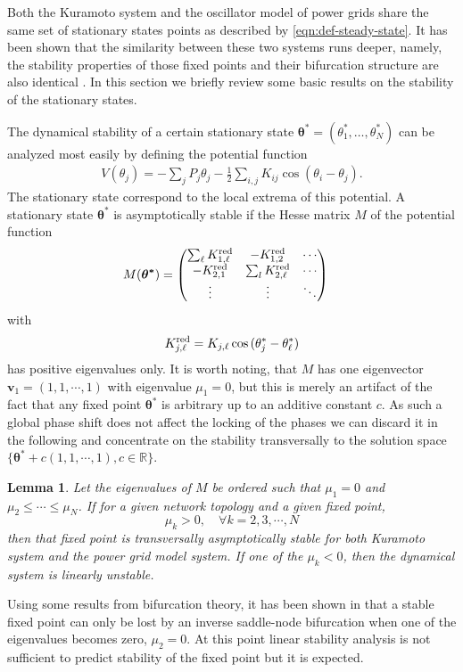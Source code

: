 \documentclass[10pt,aps,pre,preprint,superscriptaddress]{revtex4-1}
\newcommand{\be}{\begin{equation}}
\newcommand{\ee}{\end{equation}}
\renewcommand{\vec}[1]{\boldsymbol{#1}}
\newtheorem{lemma}{Lemma}
\begin{document}
Both the Kuramoto system and the oscillator model of power grids share the same 
set of stationary states points as described by \eqref{eqn:def-steady-state}. It has 
been shown that the similarity between these two systems runs deeper, namely, the 
stability properties of those fixed points and their bifurcation structure are also identical 
\cite{14bifurcation}. In this section we briefly review some basic results on the stability
of the stationary states. 


The dynamical stability of a certain stationary state 
$\vec{\theta^*}=(\theta_1^*,\ldots,\theta_N^*)$ 
can be analyzed most easily by 
defining the potential function
\begin{align}
\label{eq-potential}
V(\theta_j)=- \sum_j P_j \theta_j - \frac{1}{2} \sum_{i,j} K_{ij} \cos(\theta_i - \theta_j).
\end{align}
The stationary state correspond to the local extrema of this potential. A stationary
state $\vec{\theta}^*$ is asymptotically stable if the Hesse matrix $M$ of the potential 
function 
\begin{align}
\label{eq-M}
   M(\vec{\theta^*})&=\begin{pmatrix}
      \sum_\ell K_{1,\ell}^{\rm red} & 
              - K_{1,2}^{\rm red} & \cdots \\
     - K_{2,1}^{\rm red} & 
               \sum_l K_{2, \ell}^{\rm red} & \cdots \\
       \vdots & \vdots  & \ddots 
  \end{pmatrix}
\end{align}
with
\be
   K_{j,\ell}^{\rm red} = K_{j,\ell} \cos{(\theta_j^*-\theta_\ell^*)} 
\ee
has positive eigenvalues only. It is worth noting, that $M$ has one eigenvector 
$\vec{v}_1=(1,1,\cdots,1)$ with eigenvalue $\mu_1 = 0$, but this is merely 
an artifact of the fact that any fixed point $\vec{\theta^*}$ is arbitrary up to an 
additive constant $c$. As such a global phase shift does not affect the locking of 
the phases we can discard it in the following and concentrate on the stability 
transversally to the solution space 
$\{ \vec{\theta^*} + c (1,1,\cdots,1), c \in \mathbb{R} \}$.

\begin{lemma}
\label{thm:stability-M}
Let the eigenvalues of $M$ be ordered such that $\mu_1=0$ and 
$\mu_2\leq\cdots\leq \mu_N$.  
If for a given network topology and a given fixed point, 
\be
   \mu_k > 0, \quad \forall k=2,3,\cdots,N
\ee
then that fixed point is transversally \emph{asymptotically stable} for both 
Kuramoto system and the power grid model system. 
If one of the $\mu_k < 0$, then the dynamical system 
is linearly unstable.
\end{lemma}
Using some results from bifurcation theory, it has been shown in
\cite{14bifurcation} that a stable fixed point can only be lost by an inverse 
saddle-node bifurcation when one of the eigenvalues becomes zero,
$\mu_2 = 0$. At this point linear stability analysis is not sufficient to
predict stability of the fixed point but it is expected.
\end{document}
